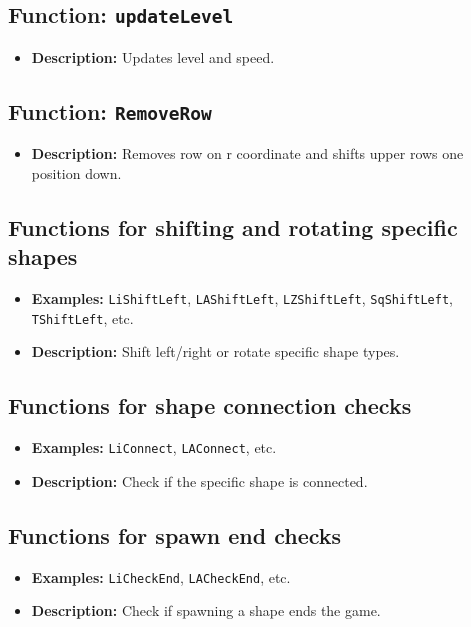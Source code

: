 \documentclass{article}
\begin{document}
\subsection{Function: \texttt{updateLevel}}
\begin{itemize}
    \item \textbf{Description:} Updates level and speed.
\end{itemize}

\subsection{Function: \texttt{RemoveRow}}
\begin{itemize}
    \item \textbf{Description:} Removes row on r coordinate and shifts upper rows one position down.
\end{itemize}

\subsection{Functions for shifting and rotating specific shapes}
\begin{itemize}
    \item \textbf{Examples:} \texttt{LiShiftLeft}, \texttt{LAShiftLeft}, \texttt{LZShiftLeft}, \texttt{SqShiftLeft}, \texttt{TShiftLeft}, etc.
    \item \textbf{Description:} Shift left/right or rotate specific shape types.
\end{itemize}

\subsection{Functions for shape connection checks}
\begin{itemize}
    \item \textbf{Examples:} \texttt{LiConnect}, \texttt{LAConnect}, etc.
    \item \textbf{Description:} Check if the specific shape is connected.
\end{itemize}

\subsection{Functions for spawn end checks}
\begin{itemize}
    \item \textbf{Examples:} \texttt{LiCheckEnd}, \texttt{LACheckEnd}, etc.
    \item \textbf{Description:} Check if spawning a shape ends the game.
\end{itemize}
\end{document}
